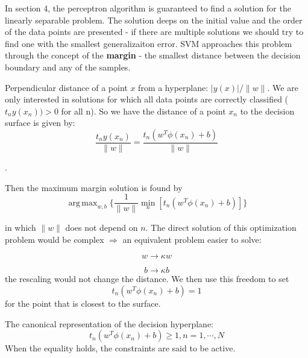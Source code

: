 \documentclass[twoside]{article}
\DeclareMathOperator*{\argmax}{arg\,max}
\begin{document}
In section 4, the perceptron algorithm is guaranteed to find a solution for the linearly separable problem. The solution deeps on the initial value and the order of the data points are presented - if there are multiple solutions we should try to find one with the smallest generalizaiton error.
SVM approaches this problem through the concept of the \textbf{margin} - the smallest distance between the decision boundary and any of the samples.

Perpendicular distance of a point $x$ from a hyperplane: $ {\lvert y(x) \rvert} / \lVert w \rVert$. We are only interested in solutions for which all data points are correctly classified ($t_n y(x_n)) >0$ for all n). So we have the distance of a point $x_n$ to the decision surface is given by:
\begin{equation}
\frac{t_ny(x_n)}{\lVert w \rVert} = \frac{t_n(w^T \phi(x_n)+b)}{\lVert w \rVert}
\end{equation}

{\color{red}{The margin is given by the perpendicular distance to the closest point $x_n$ from the data set, $w$ and $b$ need optimized in order to maximize the distance}}.

Then the maximum margin solution is found by
\begin{equation}
\argmax_{w, b} \{ \frac{1}{\lVert w \rVert} \min_n[t_n(w^T \phi(x_n)+b)]\}
\end{equation}

in which $\lVert w \rVert$ does not depend on $n$.
The direct solution of this optimization problem would be complex $\Rightarrow$ an equivalent problem easier to solve:

\begin{equation}
w \rightarrow \kappa w
\end{equation}

\begin{equation}
b \rightarrow \kappa b
\end{equation}
the rescaling would not change the distance.
We then use this freedom to set 
\begin{equation}
t_n(w^T \phi(x_n)+b)=1
\end{equation}
for the point that is closest to the surface.  

The canonical representation of the decision hyperplane:
\begin{equation}
t_n(w^T \phi(x_n)+b) \geq 1,   n = 1,\cdots, N
\end{equation}
When the equality holds, the constraints are said to be active.
\end{document}
